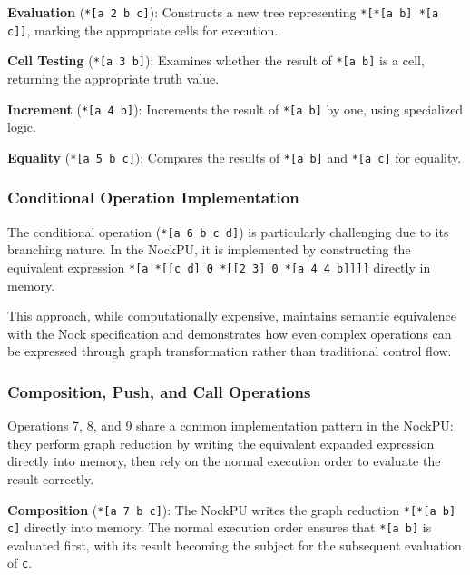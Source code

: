 \documentclass[twoside]{article}
\begin{document}
\textbf{Evaluation} (\texttt{*[a 2 b c]}): Constructs a new tree representing \texttt{*[*[a b] *[a c]]}, marking the appropriate cells for execution.


\textbf{Cell Testing} (\texttt{*[a 3 b]}): Examines whether the result of \texttt{*[a b]} is a cell, returning the appropriate truth value.

\textbf{Increment} (\texttt{*[a 4 b]}): Increments the result of \texttt{*[a b]} by one, using specialized logic.

\textbf{Equality} (\texttt{*[a 5 b c]}): Compares the results of \texttt{*[a b]} and \texttt{*[a c]} for equality.

\subsubsection{Conditional Operation Implementation}

The conditional operation (\texttt{*[a 6 b c d]}) is particularly challenging due to its branching nature. In the NockPU, it is implemented by constructing the equivalent expression \texttt{*[a *[[c d] 0 *[[2 3] 0 *[a 4 4 b]]]]} directly in memory.

This approach, while computationally expensive, maintains semantic equivalence with the Nock specification and demonstrates how even complex operations can be expressed through graph transformation rather than traditional control flow.

\subsubsection{Composition, Push, and Call Operations}

Operations 7, 8, and 9 share a common implementation pattern in the NockPU: they perform graph reduction by writing the equivalent expanded expression directly into memory, then rely on the normal execution order to evaluate the result correctly.

\textbf{Composition} (\texttt{*[a 7 b c]}): The NockPU writes the graph reduction \texttt{*[*[a b] c]} directly into memory. The normal execution order ensures that \texttt{*[a b]} is evaluated first, with its result becoming the subject for the subsequent evaluation of \texttt{c}.
\end{document}
